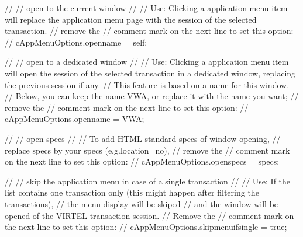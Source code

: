 \documentclass[letterpaper,10pt,english]{sphinxmanual}
\begin{document}
\begin{sphinxVerbatim}[commandchars=\\\{\}]
//
// open to the current window
// \PYGZhy{}\PYGZhy{}\PYGZhy{}\PYGZhy{}\PYGZhy{}\PYGZhy{}\PYGZhy{}\PYGZhy{}\PYGZhy{}\PYGZhy{}\PYGZhy{}\PYGZhy{}\PYGZhy{}\PYGZhy{}\PYGZhy{}\PYGZhy{}\PYGZhy{}\PYGZhy{}\PYGZhy{}\PYGZhy{}\PYGZhy{}\PYGZhy{}\PYGZhy{}\PYGZhy{}\PYGZhy{}\PYGZhy{}
// Use: Clicking a application menu item will replace the application menu page with the session of the selected transaction.
// remove the // comment mark on the next line to set this option:
// cAppMenuOptions.open\PYGZus{}name = \PYGZdq{}\PYGZus{}self\PYGZdq{};

//
// open to a dedicated window
// \PYGZhy{}\PYGZhy{}\PYGZhy{}\PYGZhy{}\PYGZhy{}\PYGZhy{}\PYGZhy{}\PYGZhy{}\PYGZhy{}\PYGZhy{}\PYGZhy{}\PYGZhy{}\PYGZhy{}\PYGZhy{}\PYGZhy{}\PYGZhy{}\PYGZhy{}\PYGZhy{}\PYGZhy{}\PYGZhy{}\PYGZhy{}\PYGZhy{}\PYGZhy{}\PYGZhy{}\PYGZhy{}\PYGZhy{}
// Use: Clicking a application menu item will open the session of the selected transaction in a dedicated window, replacing the previous session if any.
// This feature is based on a name for this window.
// Below, you can keep the name \PYGZdq{}VWA\PYGZdq{}, or replace it with the name you want;
// remove the // comment mark on the next line to set this option:
// cAppMenuOptions.open\PYGZus{}name = \PYGZdq{}VWA\PYGZdq{};

//
// open specs
// \PYGZhy{}\PYGZhy{}\PYGZhy{}\PYGZhy{}\PYGZhy{}\PYGZhy{}\PYGZhy{}\PYGZhy{}\PYGZhy{}\PYGZhy{}
// To add HTML standard specs of window opening,
// replace specs by your specs (e.g.\PYGZdq{}location=no\PYGZdq{}),
// remove the // comment mark on the next line to set this option:
// cAppMenuOptions.open\PYGZus{}specs = specs;



//
// skip the application menu in case of a single transaction
// \PYGZhy{}\PYGZhy{}\PYGZhy{}\PYGZhy{}\PYGZhy{}\PYGZhy{}\PYGZhy{}\PYGZhy{}\PYGZhy{}\PYGZhy{}\PYGZhy{}\PYGZhy{}\PYGZhy{}\PYGZhy{}\PYGZhy{}\PYGZhy{}\PYGZhy{}\PYGZhy{}\PYGZhy{}\PYGZhy{}\PYGZhy{}\PYGZhy{}\PYGZhy{}\PYGZhy{}\PYGZhy{}\PYGZhy{}\PYGZhy{}\PYGZhy{}\PYGZhy{}\PYGZhy{}\PYGZhy{}\PYGZhy{}\PYGZhy{}\PYGZhy{}\PYGZhy{}\PYGZhy{}\PYGZhy{}\PYGZhy{}\PYGZhy{}\PYGZhy{}\PYGZhy{}\PYGZhy{}\PYGZhy{}\PYGZhy{}\PYGZhy{}\PYGZhy{}\PYGZhy{}\PYGZhy{}\PYGZhy{}\PYGZhy{}\PYGZhy{}\PYGZhy{}\PYGZhy{}\PYGZhy{}\PYGZhy{}\PYGZhy{}\PYGZhy{}\PYGZhy{}
// Use: If the list contains one transaction only (this might happen after filtering the transactions),
// the menu display will be skiped
// and the window will be opened of the VIRTEL transaction session.
// Remove the // comment mark on the next line to set this option:
// cAppMenuOptions.skip\PYGZus{}menu\PYGZus{}if\PYGZus{}single = true;




\end{sphinxVerbatim}
\end{document}
